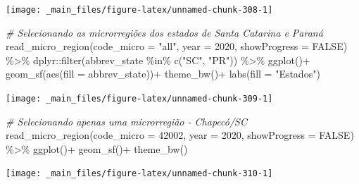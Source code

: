 \documentclass[
  brazilian,
]{book}
\newenvironment{Shaded}{\begin{snugshade}}{\end{snugshade}}
\newcommand{\AttributeTok}[1]{\textcolor[rgb]{0.77,0.63,0.00}{#1}}
\newcommand{\CommentTok}[1]{\textcolor[rgb]{0.56,0.35,0.01}{\textit{#1}}}
\newcommand{\ConstantTok}[1]{\textcolor[rgb]{0.00,0.00,0.00}{#1}}
\newcommand{\DecValTok}[1]{\textcolor[rgb]{0.00,0.00,0.81}{#1}}
\newcommand{\FunctionTok}[1]{\textcolor[rgb]{0.00,0.00,0.00}{#1}}
\newcommand{\NormalTok}[1]{#1}
\newcommand{\SpecialCharTok}[1]{\textcolor[rgb]{0.00,0.00,0.00}{#1}}
\newcommand{\StringTok}[1]{\textcolor[rgb]{0.31,0.60,0.02}{#1}}
\begin{document}
\begin{center}\texttt{[image: \_main\_files/figure-latex/unnamed-chunk-308-1]} \end{center}

\begin{Shaded}
\begin{Highlighting}[]
\CommentTok{\# Selecionando as microrregiões dos estados de Santa Catarina e Paraná}
\FunctionTok{read\_micro\_region}\NormalTok{(}\AttributeTok{code\_micro =} \StringTok{"all"}\NormalTok{,}
                  \AttributeTok{year =} \DecValTok{2020}\NormalTok{,}
                  \AttributeTok{showProgress =} \ConstantTok{FALSE}\NormalTok{) }\SpecialCharTok{\%\textgreater{}\%} 
\NormalTok{  dplyr}\SpecialCharTok{::}\FunctionTok{filter}\NormalTok{(abbrev\_state }\SpecialCharTok{\%in\%} \FunctionTok{c}\NormalTok{(}\StringTok{"SC"}\NormalTok{, }\StringTok{"PR"}\NormalTok{)) }\SpecialCharTok{\%\textgreater{}\%} 
  \FunctionTok{ggplot}\NormalTok{()}\SpecialCharTok{+}
  \FunctionTok{geom\_sf}\NormalTok{(}\FunctionTok{aes}\NormalTok{(}\AttributeTok{fill =}\NormalTok{ abbrev\_state))}\SpecialCharTok{+}
  \FunctionTok{theme\_bw}\NormalTok{()}\SpecialCharTok{+}
  \FunctionTok{labs}\NormalTok{(}\AttributeTok{fill =} \StringTok{"Estados"}\NormalTok{)}
\end{Highlighting}
\end{Shaded}

\begin{center}\texttt{[image: \_main\_files/figure-latex/unnamed-chunk-309-1]} \end{center}

\begin{Shaded}
\begin{Highlighting}[]
\CommentTok{\# Selecionando apenas uma microrregião {-} Chapecó/SC}
\FunctionTok{read\_micro\_region}\NormalTok{(}\AttributeTok{code\_micro =} \DecValTok{42002}\NormalTok{,}
                  \AttributeTok{year =} \DecValTok{2020}\NormalTok{,}
                  \AttributeTok{showProgress =} \ConstantTok{FALSE}\NormalTok{) }\SpecialCharTok{\%\textgreater{}\%} 
  \FunctionTok{ggplot}\NormalTok{()}\SpecialCharTok{+}
  \FunctionTok{geom\_sf}\NormalTok{()}\SpecialCharTok{+}
  \FunctionTok{theme\_bw}\NormalTok{()}
\end{Highlighting}
\end{Shaded}

\begin{center}\texttt{[image: \_main\_files/figure-latex/unnamed-chunk-310-1]} \end{center}
\end{document}
